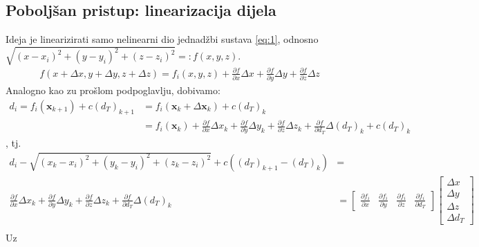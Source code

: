 \documentclass[a4paper,twoside,12pt]{memoir} %
\begin{document}
\subsection{Poboljšan pristup: linearizacija dijela}
Ideja je linearizirati samo nelinearni dio jednadžbi sustava
\ref{eq:1}, odnosno  \\ $\sqrt{(x-x_i)^{2}+(y-y_i)^{2}+(z-z_i)^{2}} =: f(x,y,z)$.
\begin{align*}
f(x + \Delta x,y+ \Delta y,z + \Delta z) = f_i(x,y,z) + \frac{\partial f}{\partial x}\Delta x + \frac{\partial f}{\partial y}\Delta y + \frac{\partial f}{\partial z}\Delta z
\end{align*}
Analogno kao zu prošlom podpoglavlju, dobivamo:
\begin{align*}
	d_i  = f_i(\mathbf{x}_{k+1}) + c(d_T)_{k+1} & = f_i(\mathbf{x}_{k} + \Delta\mathbf{x}_{k}) +  c(d_T)_k 
	\\ & = f_i(\mathbf{x}_{k}) + \frac{\partial f}{\partial x}\Delta x_k + \frac{\partial f}{\partial y}\Delta y_k + \frac{\partial f}{\partial z}\Delta z_k + \frac{\partial f}{\partial d_T}\Delta (d_T)_k +  c(d_T)_k 
\end{align*}
, tj.
\begin{align*}
d_i - \sqrt{(x_k-x_i)^{2}+(y_k-y_i)^{2}+(z_k-z_i)^{2}} + c((d_T)_{k+1}-(d_T)_k) & = \\
\frac{\partial f}{\partial x}\Delta x_k + \frac{\partial f}{\partial y}\Delta y_k + \frac{\partial f}{\partial z}\Delta z_k + \frac{\partial f}{\partial d_T}\Delta (d_T)_k &= 
\begin{bmatrix}
\frac{\partial f_i}{\partial x} &
\frac{\partial f_i}{\partial y} &
\frac{\partial f_i}{\partial z} &
\frac{\partial f_i}{\partial d_T}
\end{bmatrix}
\begin{bmatrix}
\Delta x \\
\Delta y \\
\Delta z \\
\Delta d_T
\end{bmatrix} \\ 
\end{align*}
Uz
\end{document}
